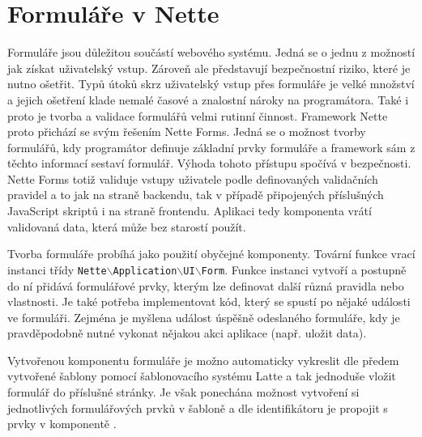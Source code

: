 \documentclass[czech,BP]{thesiskiv}
\begin{document}
		\section{Formuláře v Nette}
		\par Formuláře jsou důležitou součástí webového systému. Jedná se o jednu z možností jak získat uživatelský vstup. Zároveň ale představují bezpečnostní riziko, které je nutno ošetřit. Typů útoků skrz uživatelský vstup přes formuláře je velké množství a jejich ošetření klade nemalé časové a znalostní nároky na programátora. Také i proto je tvorba a validace formulářů velmi rutinní činnost. Framework Nette proto přichází se svým řešením Nette Forms. Jedná se o možnost tvorby formulářů, kdy programátor definuje základní prvky formuláře a framework sám z těchto informací sestaví formulář. Výhoda tohoto přístupu spočívá v bezpečnosti. Nette Forms totiž validuje vstupy uživatele podle definovaných validačních pravidel a to jak na straně backendu, tak v případě připojených příslušných JavaScript skriptů i na straně frontendu. Aplikaci tedy komponenta vrátí validovaná data, která může bez starostí použít.
		\par Tvorba formuláře probíhá jako použití obyčejné komponenty. Tovární funkce vrací instanci třídy \texttt{Nette$\backslash$Application$\backslash$UI$\backslash$Form}. Funkce instanci vytvoří a postupně do ní přidává formulářové prvky, kterým lze definovat další různá pravidla nebo vlastnosti. Je také potřeba implementovat kód, který se spustí po nějaké události ve formuláři. Zejména je myšlena událost úspěšně odeslaného formuláře, kdy je pravděpodobně nutné vykonat nějakou akci aplikace (např. uložit data).
		\par Vytvořenou komponentu formuláře je možno automaticky vykreslit dle předem vytvořené šablony pomocí šablonovacího systému Latte a tak jednoduše vložit formulář do příslušné stránky. Je však ponechána možnost vytvoření si jednotlivých formulářových prvků v šabloně a dle identifikátoru je propojit s prvky v komponentě \cite{NetteDI}.
		
\end{document}
